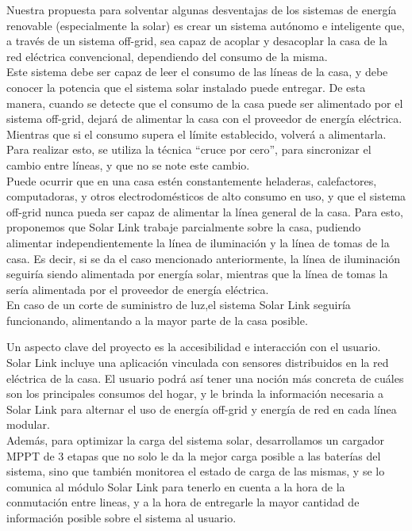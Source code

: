 Nuestra propuesta para solventar algunas desventajas de los sistemas de energía renovable (especialmente la solar) es crear un sistema autónomo e inteligente que, a través de un sistema off-grid, sea capaz de acoplar y desacoplar la casa de la red eléctrica convencional, dependiendo del consumo de la misma.\\

Este sistema debe ser capaz de leer el consumo de las líneas de la casa, y debe conocer la potencia que el sistema solar instalado puede entregar. De esta manera, cuando se detecte que el consumo de la casa puede ser alimentado por el sistema off-grid, dejará de alimentar la casa con el proveedor de energía eléctrica. Mientras que si el consumo supera el límite establecido, volverá a alimentarla. Para realizar esto, se utiliza la técnica “cruce por cero”, para sincronizar el cambio entre líneas, y que no se note este cambio.\\

Puede ocurrir que en una casa estén constantemente heladeras, calefactores, computadoras, y otros electrodomésticos de alto consumo en uso, y que el sistema off-grid nunca pueda ser capaz de alimentar la línea general de la casa. Para esto, proponemos que Solar Link trabaje parcialmente sobre la casa, pudiendo alimentar independientemente la línea de iluminación y la línea de tomas de la casa. Es decir, si se da el caso mencionado anteriormente, la línea de iluminación seguiría siendo alimentada por energía solar, mientras que la línea de tomas la sería alimentada por el proveedor de energía eléctrica.\\

En caso de un corte de suministro de luz,el sistema Solar Link seguiría funcionando, alimentando a la mayor parte de la casa posible.

Un aspecto clave del proyecto es la accesibilidad e interacción con el usuario. Solar Link incluye una aplicación vinculada con sensores distribuidos en la red eléctrica de la casa. El usuario podrá así tener una noción más concreta de cuáles son los principales consumos del hogar, y le brinda la información necesaria a Solar Link para alternar el uso de energía off-grid y energía de red en cada línea modular.\\

Además, para optimizar la carga del sistema solar, desarrollamos un cargador MPPT de 3 etapas que no solo le da la mejor carga posible a las baterías del sistema, sino que también monitorea el estado de carga de las mismas, y se lo comunica al módulo Solar Link para tenerlo en cuenta a la hora de la conmutación entre lineas, y a la hora de entregarle la mayor cantidad de información posible sobre el sistema al usuario.\\

\clearpage